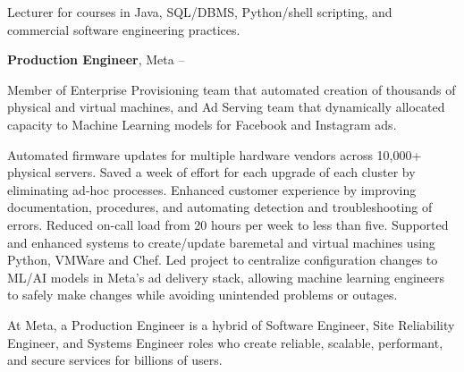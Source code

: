 \documentclass[MMMMyyyy,nonstopmode]{simpleresumecv_stacked}
\newif\ifLOCATION
\begin{document}
\begin{Body}
\ifLOCATION
\hfill 
Rochester, New York
\fi

\Gap
\begin{Detail}
Lecturer for courses in Java, SQL/DBMS, Python/shell scripting, and commercial software engineering practices.
\end{Detail}

\BigGap
\fi

\Entry
\textbf{Production Engineer}, Meta
\hfill
{} -- 


\Gap
\begin{Detail}
Member of Enterprise Provisioning team that automated creation of thousands of physical and virtual machines,
and Ad Serving team that dynamically allocated capacity to Machine Learning models for Facebook and Instagram ads.

\Gap 

\BulletItem
	Automated firmware updates for multiple hardware vendors across 10,000+ physical servers. Saved a week of effort for each upgrade of each cluster by eliminating ad-hoc processes.
\BulletItem
	Enhanced customer experience by improving documentation, procedures, and automating detection and troubleshooting of errors. Reduced on-call load from 20 hours per week to less than five.
\BulletItem
	Supported and enhanced systems to create/update baremetal and virtual machines using Python, VMWare and Chef.
\BulletItem
	Led project to centralize configuration changes to ML/AI models in Meta’s ad delivery stack, allowing machine learning engineers to safely make changes while avoiding unintended problems or outages.

\iffalse 	%

At Meta, a Production Engineer is a hybrid of Software Engineer, Site Reliability Engineer, and Systems Engineer roles
who create reliable, scalable, performant, and secure services for billions of users.


\end{Detail}
\end{Body}
\end{document}
